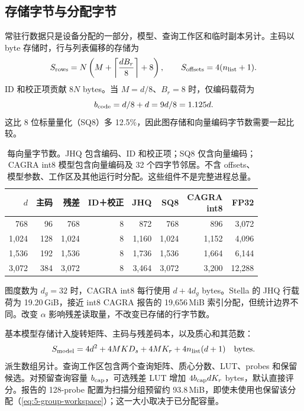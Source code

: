 \subsection{存储字节与分配字节}

常驻行数据只是设备分配的一部分，模型、查询工作区和临时副本另计。主码以 byte 存储时，行与列表偏移的存储为
\begin{equation}
 S_{\rm rows}=N\left(M+\left\lceil\frac{dB_r}{8}\right\rceil+8\right),
 \qquad S_{\rm offsets}=4(n_{\rm list}+1).
 \label{eq:4-row-storage}
\end{equation}
ID 和校正项贡献 $8N$ bytes。当 $M=d/8$、$B_r=8$ 时，仅编码载荷为
\[
 b_{\rm code}=d/8+d=9d/8=1.125d.
\]
这比 8 位标量量化（SQ8）多 12.5\%，因此图存储和向量编码字节数需要一起比较。

\begin{table}[!htbp]
\centering
\caption[每向量存储模型]{每向量字节数。JHQ 包含编码、ID 和校正项；SQ8 仅含向量编码；CAGRA int8 模型包含向量编码及 32 个四字节邻居。不含 offsets、模型参数、工作区及其他运行时分配。这些组件不是完整进程总量。}
\label{tab:4-bytes}
\footnotesize\setlength{\tabcolsep}{4pt}
\begin{tabular}{@{}rrrrrrrr@{}}
\toprule
$d$ & 主码 & 残差 & ID＋校正 & JHQ & SQ8 & \shortstack{CAGRA\\int8} & FP32 \\
\midrule
768 & 96 & 768 & 8 & 872 & 768 & 896 & 3,072 \\
1,024 & 128 & 1,024 & 8 & 1,160 & 1,024 & 1,152 & 4,096 \\
1,536 & 192 & 1,536 & 8 & 1,736 & 1,536 & 1,664 & 6,144 \\
3,072 & 384 & 3,072 & 8 & 3,464 & 3,072 & 3,200 & 12,288 \\
\bottomrule
\end{tabular}
\end{table}

图度数为 $d_g=32$ 时，CAGRA int8 每行使用 $d+4d_g$ bytes。Stella 的 JHQ 行载荷为 19.20\,GiB，接近 int8 CAGRA 报告的 19,656\,MiB 索引分配，但统计边界不同。改变 $\alpha$ 影响残差读取量，不改变已存储的行字节数。

基本模型存储计入旋转矩阵、主码与残差码本，以及质心和其范数：
\[
 S_{\rm model}
 =4d^2+4MKD_s+4MK_r+4n_{\rm list}(d+1)
 \quad\text{bytes}.
\]
派生数组另计。查询工作区包含两个查询矩阵、质心分数、LUT、probes 和保留候选。对预留查询容量 $b_{\rm cap}$，可选残差 LUT 增加 $4b_{\rm cap}dK_r$ bytes，默认直接评分。报告的 128-probe 配置为扫描分组预留约 93.8\,MiB，即使未使用也保留该分配（\cref{eq:5-group-workspace}）；这一大小取决于已分配容量。


